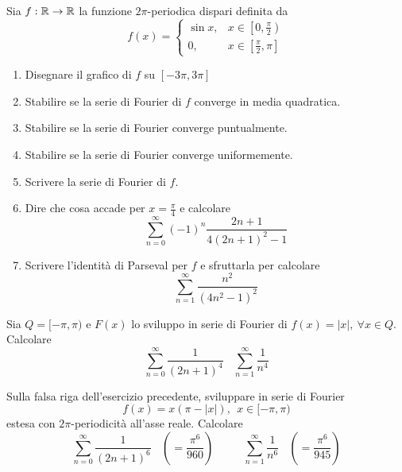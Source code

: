 Sia $f:\mathbb{R} \rightarrow \mathbb{R} $ la funzione $2\pi $-periodica dispari definita da
\begin{equation*}
f( x) =\begin{cases}
\sin x, & x\in \left[ 0,\frac{\pi }{2}\right)\\
0, & x\in \left[\frac{\pi }{2} ,\pi \right]
\end{cases}
\end{equation*}
\begin{enumerate}
\item Disegnare il grafico di $f$ su $[ -3\pi ,3\pi ]$
\item Stabilire se la serie di Fourier di $f$ converge in media quadratica.
\item Stabilire se la serie di Fourier converge puntualmente.
\item Stabilire se la serie di Fourier converge uniformemente.
\item Scrivere la serie di Fourier di $f$.
\item Dire che cosa accade per $x=\frac{\pi }{4}$ e calcolare\begin{equation*}
\sum\limits ^{\infty }_{n=0}( -1)^{n}\frac{2n+1}{4( 2n+1)^{2} -1}
\end{equation*}
\item Scrivere l'identità di Parseval per $f$ e sfruttarla per calcolare\begin{equation*}
\sum\limits ^{\infty }_{n=1}\frac{n^{2}}{\left( 4n^{2} -1\right)^{2}}
\end{equation*}
\end{enumerate}
\Esercizio{}

Sia $Q=[ -\pi ,\pi )$ e $F( x)$ lo sviluppo in serie di Fourier di $f( x) =| x| ,\ \forall x\in Q$. Calcolare
\begin{equation*}
\sum\limits ^{\infty }_{n=0}\frac{1}{( 2n+1)^{4}} \ \ \ \ \sum\limits ^{\infty }_{n=1}\frac{1}{n^{4}}
\end{equation*}
\Esercizio{}

Sulla falsa riga dell'esercizio precedente, sviluppare in serie di Fourier
\begin{equation*}
f( x) =x( \pi -| x| ) ,\ \ x\in [ -\pi ,\pi )
\end{equation*}
estesa con $2\pi $-periodicità all'asse reale. Calcolare
\begin{equation*}
\sum\limits ^{\infty }_{n=0}\frac{1}{( 2n+1)^{6}} \ \ \ \ \left( =\frac{\pi ^{6}}{960}\right) \ \ \ \ \ \ \ \ \ \ \ \ \sum\limits ^{\infty }_{n=1}\frac{1}{n^{6}} \ \ \ \ \left( =\frac{\pi ^{6}}{945}\right)
\end{equation*}
\Esercizio{}

